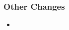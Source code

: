 \documentclass[12pt]{article}
\newcommand{\mpom}[0]{\mbox{MP-Opt-Model}}
\newcommand{\code}[1]{{\relsize{-0.5}{\tt{{#1}}}}}  %
\numberwithin{equation}{section}
\numberwithin{table}{section}
\numberwithin{figure}{section}
\begin{document}
\begin{appendices}
\subsubsection*{Other Changes}
\begin{itemize}
\item

\end{itemize}

% 
% 
% 
% 
% 

\end{appendices}
\end{document}
